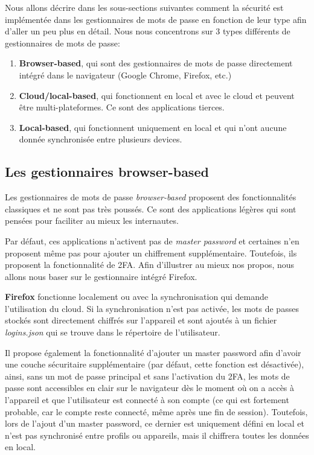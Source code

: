 Nous allons décrire dans les sous-sections suivantes comment la sécurité est implémentée dans les gestionnaires de mots de passe en fonction de leur type afin d'aller un peu plus en détail. Nous nous concentrons sur 3 types différents de gestionnaires de mots de passe:

\begin{enumerate}
	\item \textbf{Browser-based}, qui sont des gestionnaires de mots de passe directement intégré dans le navigateur (Google Chrome, Firefox, etc.)
	\item \textbf{Cloud/local-based}, qui fonctionnent en local et avec le cloud et peuvent être multi-plateformes. Ce sont des applications tierces.
	\item \textbf{Local-based}, qui fonctionnent uniquement en local et qui n'ont aucune donnée synchronisée entre plusieurs devices. 
\end{enumerate}

\subsection{Les gestionnaires browser-based}
Les gestionnaires de mots de passe \textit{browser-based} proposent des fonctionnalités classiques et ne sont pas très poussés. Ce sont des applications légères qui sont pensées pour faciliter au mieux les internautes.\cite{Browser}

Par défaut, ces applications n'activent pas de \textit{master password} et certaines n'en proposent même pas pour ajouter un chiffrement supplémentaire. Toutefois, ils proposent la fonctionnalité de 2FA. Afin d'illustrer au mieux nos propos, nous allons nous baser sur le gestionnaire intégré Firefox.

\textbf{Firefox} fonctionne localement ou avec la synchronisation qui demande l'utilisation du cloud. Si la synchronisation n'est pas activée, les mots de passes stockés sont directement chiffrés sur l'appareil et sont ajoutés à un fichier \textit{logins.json} qui se trouve dans le répertoire de l'utilisateur. 

Il propose également la fonctionnalité d'ajouter un master password afin d'avoir une couche sécuritaire supplémentaire (par défaut, cette fonction est désactivée), ainsi, sans un mot de passe principal et sans l'activation du 2FA, les mots de passe sont accessibles en clair sur le navigateur dès le moment où on a accès à l'appareil et que l'utilisateur est connecté à son compte (ce qui est fortement probable, car le compte reste connecté, même après une fin de session). Toutefois, lors de l'ajout d'un master password, ce dernier est uniquement défini en local et n'est pas synchronisé entre profils ou appareils, mais il chiffrera toutes les données en local. 

